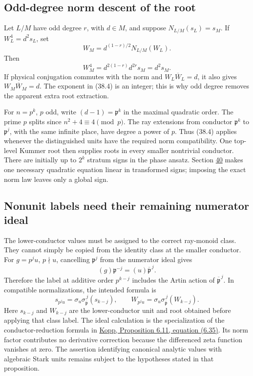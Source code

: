 \documentclass[11pt,reqno]{amsart}
\theoremstyle{plain}
\begin{document}
\subsection{Odd-degree norm descent of the root}\label{sec:38.2}

Let \(L/M\) have odd degree \(r\), with \(d\in M\), and suppose
\(N_{L/M}(s_L)=s_M\). If \(W_L^4=d^2s_L\), set
\begin{equation*}
 \boxed{\quad W_M=d^{(1-r)/2}N_{L/M}(W_L).\quad} \tag{38.4}
\end{equation*}
Then
\[
 W_M^4=d^{2(1-r)}d^{2r}s_M=d^2s_M.
\]
If physical conjugation commutes with the norm and
\(W_L\overline W_L=d\), it also gives
\(W_M\overline W_M=d\). The exponent in (38.4) is an integer;
this is why odd degree removes the apparent extra root extraction.

For \(n=p^k\), \(p\) odd, write
\((d-1)=\mathfrak p^k\) in the maximal quadratic order. The prime
\(p\) splits since \(n^2+4\equiv4\pmod p\). The ray extensions
from conductor \(\mathfrak p^k\) to
\(\mathfrak p^j\), with the same infinite place, have degree a
power of \(p\). Thus (38.4) applies whenever the distinguished
units have the required norm compatibility. One top-level Kummer
root then supplies roots in every smaller nontrivial conductor.
There are initially up to \(2^k\) stratum signs in the phase ansatz.
Section \hyperref[sec:40]{40} makes one necessary quadratic equation linear in transformed
signs; imposing the exact norm law leaves only a global sign.

\subsection{Nonunit labels need their remaining numerator ideal}\label{sec:38.3}

The lower-conductor values must be assigned to the correct ray-monoid
class. They cannot simply be copied from the identity class at the
smaller conductor. For \(g=p^j u\), \(p\nmid u\), cancelling
\(\mathfrak p^j\) from the numerator ideal gives
\[
 (g)\mathfrak p^{-j}=(u)\overline{\mathfrak p}^{\,j}.
\]
Therefore the label at additive order \(p^{k-j}\) includes the
Artin action of \(\overline{\mathfrak p}^{\,j}\). In compatible
normalizations, the intended formula is
\begin{equation*}
 s_{p^j u}
 =\sigma_u\sigma_{\overline{\mathfrak p}}^{\,j}
    (s_{k-j}),\qquad
 W_{p^j u}
 =\sigma_u\sigma_{\overline{\mathfrak p}}^{\,j}
    (W_{k-j}). \tag{38.5}
\end{equation*}
Here \(s_{k-j}\) and \(W_{k-j}\) are the lower-conductor unit and
root obtained before applying that class label. The ideal calculation
is the specialization of the conductor-reduction formula in
\href{https://arxiv.org/html/2411.06763v2\#S6.E35}{Kopp, Proposition 6.11, equation (6.35)}.
Its norm factor contributes no derivative correction because the
differenced zeta function vanishes at zero. The assertion identifying
canonical analytic values with algebraic Stark units remains subject
to the hypotheses stated in that proposition.
\end{document}
